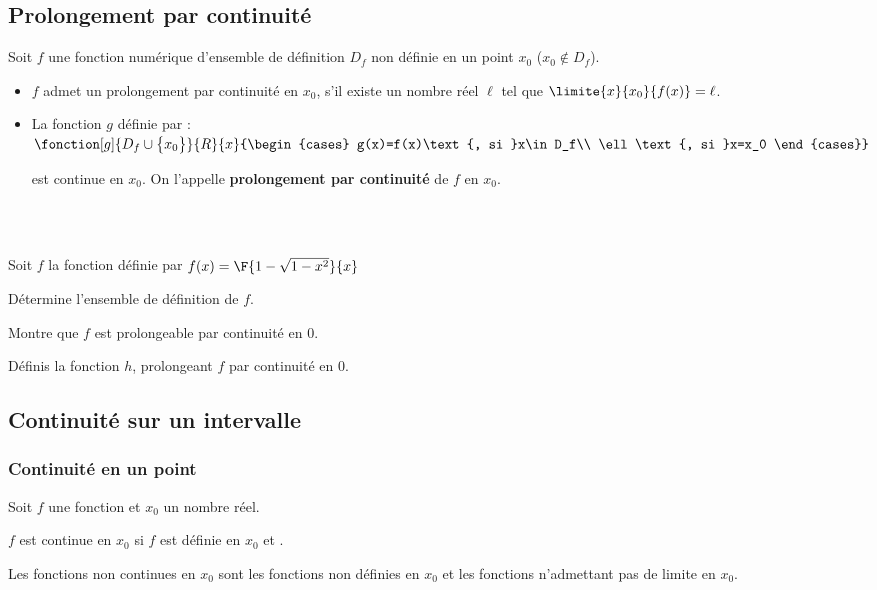 \subsection{Prolongement par continuité}
\begin{definition}
Soit $f$ une fonction numérique d'ensemble de définition $D_f$ non définie en un point $x_0$ \big($x_0\notin D_f$\big).
\begin{itemize}
\item $f$ admet un prolongement par continuité en $x_0$, s'il existe un nombre réel $\ell$ tel que $\limite{x}{x_0}{f(x)}=\ell$.
\item La fonction $g$ définie par : $\fonction[g]{D_f\cup\big\{x_0\big\}}{R}{x}{\begin{cases}
	g(x)=f(x)\text{, si }x\in D_f\\
	\ell\text{, si }x=x_0
	\end{cases}}$ 
\par est continue en $x_0$. On l'appelle \textbf{prolongement par continuité} de $f$ en $x_0$.
\end{itemize}
\end{definition}\\\\
\begin{exemple}
Soit $f$ la fonction définie par $f(x)=\F{1-\sqrt{1-x^2}}{x}$
\be \item Détermine l'ensemble de définition de $f$.
\item \be \item Montre que $f$ est prolongeable par continuité en $0$.
\item Définis la fonction $h$, prolongeant $f$ par continuité en $0$.\ee\ee
\end{exemple}\vspace*{-1cm}
\subsection{Continuité sur un intervalle}
\subsubsection{Continuité en un point}%
\begin{definition}
	Soit $f$ une fonction et $x_0$ un nombre réel.
	\par $f$ est continue en $x_0$ si $f$ est définie en $x_0$ et .
\end{definition}%
\begin{remark}
Les fonctions non continues en $x_0$ sont les fonctions non définies en $x_0$ et les fonctions n'admettant pas de limite en $x_0$.
\end{remark}%

